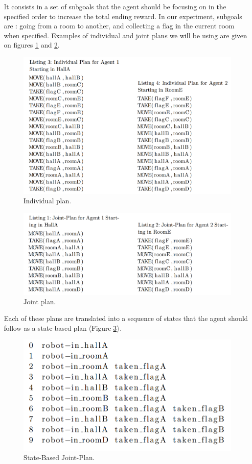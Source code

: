 \documentclass[letterpaper]{article}
\begin{document}
It consists in a set of subgoals that the agent should be focusing on in the specified order to increase the total ending reward. In our experiment, subgoals are : going from a room to another, and collecting a flag in the current room when specified. Examples of individual and joint plans we will be using are given on figures \ref{fig:plan1} and \ref{fig:plan2}.

\begin{figure}[h!]
\centering
  \includegraphics[width=0.85\linewidth]{img/individualPlan.png}
  \caption{Individual plan.}
  \label{fig:plan1}
\end{figure}

\begin{figure}[h!]
\centering
  \includegraphics[width=0.85\linewidth]{img/joinPlan.png}
  \caption{Joint plan.}
  \label{fig:plan2}
\end{figure}

Each of these plans are translated into a sequence of states that the agent should follow as a state-based plan (Figure \ref{fig:plan3}). 

\begin{figure}[h!]
\centering
  \includegraphics[width=0.85\linewidth]{img/listingFormattedJoinAgent1.png}
  \caption{State-Based Joint-Plan.}
  \label{fig:plan3}
\end{figure}
\end{document}
